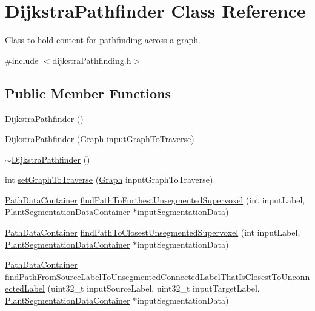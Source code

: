 \hypertarget{classDijkstraPathfinder}{\section{Dijkstra\-Pathfinder Class Reference}
\label{classDijkstraPathfinder}
}


Class to hold content for pathfinding across a graph.  




{\ttfamily \#include $<$dijkstra\-Pathfinding.\-h$>$}

\subsection*{Public Member Functions}
\begin{DoxyCompactItemize}
\item 
\hyperlink{classDijkstraPathfinder_a635adf041b1674db9227b7a942829d2c}{Dijkstra\-Pathfinder} ()
\item 
\hyperlink{classDijkstraPathfinder_a523612f9992907e5b80cc9930df82557}{Dijkstra\-Pathfinder} (\hyperlink{classGraph}{Graph} input\-Graph\-To\-Traverse)
\item 
\hyperlink{classDijkstraPathfinder_aa47f02c0cfde1806df53ed11e909d3d1}{$\sim$\-Dijkstra\-Pathfinder} ()
\item 
int \hyperlink{classDijkstraPathfinder_a64300c90245030665a7d828e16269e43}{set\-Graph\-To\-Traverse} (\hyperlink{classGraph}{Graph} input\-Graph\-To\-Traverse)
\item 
\hyperlink{classPathDataContainer}{Path\-Data\-Container} \hyperlink{classDijkstraPathfinder_a42b24acdc0f7bd8702bb30228ebf630e}{find\-Path\-To\-Furthest\-Unsegmented\-Supervoxel} (int input\-Label, \hyperlink{classPlantSegmentationDataContainer}{Plant\-Segmentation\-Data\-Container} $\ast$input\-Segmentation\-Data)
\item 
\hyperlink{classPathDataContainer}{Path\-Data\-Container} \hyperlink{classDijkstraPathfinder_a168705fdccb09a13eedde09c0e2e7ad4}{find\-Path\-To\-Closest\-Unsegmented\-Supervoxel} (int input\-Label, \hyperlink{classPlantSegmentationDataContainer}{Plant\-Segmentation\-Data\-Container} $\ast$input\-Segmentation\-Data)
\item 
\hyperlink{classPathDataContainer}{Path\-Data\-Container} \hyperlink{classDijkstraPathfinder_a610b7ecdd16501d689c5aa5b35528310}{find\-Path\-From\-Source\-Label\-To\-Unsegmented\-Connected\-Label\-That\-Is\-Closest\-To\-Unconnected\-Label} (uint32\-\_\-t input\-Source\-Label, uint32\-\_\-t input\-Target\-Label, \hyperlink{classPlantSegmentationDataContainer}{Plant\-Segmentation\-Data\-Container} $\ast$input\-Segmentation\-Data)

\end{DoxyCompactItemize}
